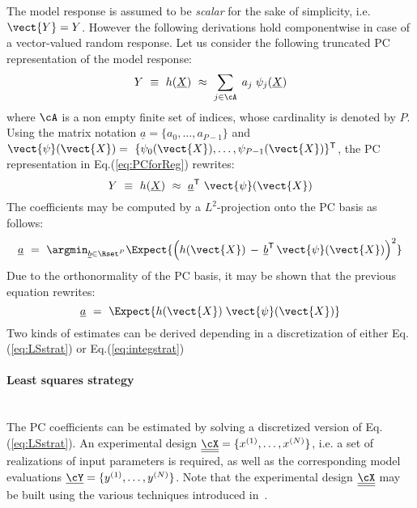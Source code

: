 {  The model response is assumed to be \emph{scalar} for the sake of simplicity, i.e. $\vect{Y} = Y$. However the following derivations hold componentwise in case of a vector-valued random response. Let us consider the following truncated PC representation of the model response:
  \begin{equation} \label{eq:PCforReg}
    Y \, \,  \equiv \, \,  h(\underline{X}) \, \, \approx \, \,  \sum_{j \in \cA} \; a_{j} \; \psi_{j}(\underline{X})
  \end{equation}
  where $\cA$ is a non empty finite set of indices, whose cardinality is denoted by $P$. Using the matrix notation $\underline{a} = \{a_{0},\dots,a_{P-1}\}$ and $\vect{\psi}(\vect{X})  = \ \{\psi_{0}(\vect{X}) , \dots , \psi_{P-1}(\vect{X}) \}^{\textsf{T}}$, the PC representation in Eq.(\ref{eq:PCforReg}) rewrites:
  \begin{equation}
    Y \, \,  \equiv \, \,  h(\underline{X}) \, \, \approx \, \,  \underline{a}^{\textsf{T}} \, \,  \vect{\psi}(\vect{X})
  \end{equation}
  The coefficients may be computed by a $L^2$-projection onto the PC basis as follows:
  \begin{equation}  \label{eq:LSstrat}
    \underline{a} \, \, = \, \,  \argmin_{\underline{b} \in \Rset^{P}} \Expect{\left( h(\vect{X})   \, - \, \underline{b}^{\textsf{T}}  \,  \vect{\psi}(\vect{X}) \right)^2}
  \end{equation}
  Due to the orthonormality of the PC basis, it may be shown that the previous equation rewrites:
  \begin{equation} \label{eq:integstrat}
    \underline{a}  \, \, = \, \,  \Expect{h(\vect{X}) \; \vect{\psi}(\vect{X})}
  \end{equation}
  Two kinds of estimates can be derived depending in a discretization of either Eq.(\ref{eq:LSstrat}) or Eq.(\ref{eq:integstrat})

  \paragraph*{Least squares strategy \\ \\}

  The PC coefficients can be estimated by solving a discretized version of Eq.(\ref{eq:LSstrat}). An experimental design $\underline{\underline{\cX}} = \{x^{(1)},\dots,x^{(N)}\}$, i.e. a set of realizations of input parameters is required, as well as the corresponding model evaluations $\underline{\cY} = \{y^{(1)},\dots,y^{(N)}\}$. Note that the experimental design $\underline{\underline{\cX}}$ may be built using the various techniques introduced in~. \\

}
